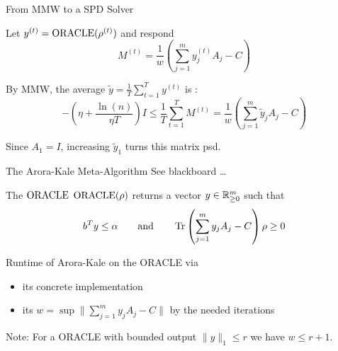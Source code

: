 \begin{frame}{From MMW to a SPD Solver}

 Let $y^{(t)}=\operatorname{ORACLE}(\rho^{(t)})$ and respond 
\begin{equation*}
 M^{(t)}= \frac{1}{w} \left( \sum_{j=1}^m y^{(t)}_j A_j - C \right)
\end{equation*}


\vspace{\floatsep}

By MMW, the average $\tilde{y}=\frac 1 T \sum_{t=1}^T y^{(t)} $ is :
\begin{equation*}
 - \left( \eta + \frac{\ln(n)}{\eta T}\right) I \leq \frac{1}{T} \sum_{t=1}^T M^{(t)} = \frac 1 w \left(\sum_{j=1}^m \tilde{y}_j A_j - C \right)
\end{equation*}

\vspace{\floatsep}

Since $A_1=I$, increasing $\tilde{y}_1$ turns this matrix psd.

\end{frame}

\begin{frame}{The Arora-Kale Meta-Algorithm}
 See blackboard \dots
\end{frame}

\begin{frame}{The $\operatorname{ORACLE}$}
  $\operatorname{ORACLE}(\rho)$ returns a vector $y\in\mathbb{R}^m_{\geq 0}$ such that
 \begin{equation*}
  b^T y \leq \alpha \qquad\text{and}\qquad \operatorname{Tr}\left(\sum_{j=1}^m y_j A_j - C \right)\rho  \geq 0
 \end{equation*}
 
 \vspace{\floatsep}
 
 Runtime of Arora-Kale  on the ORACLE via
 \begin{itemize}
  \item its concrete implementation
  \item its  $w = \sup \| \sum_{j=1}^m y_j A_j - C  \|$ by the needed iterations
 \end{itemize}
 
 \vspace{\floatsep}

 Note: For a ORACLE with bounded output $\|y\|_1 \leq r$ we have $w \leq r + 1$.
 

\end{frame}
